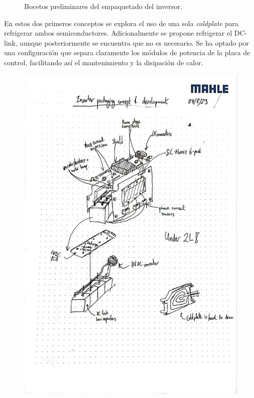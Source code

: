 \begin{figure}[H]
\begin{minipage}{0.45\textwidth}
	\end{minipage}
	\caption{Bocetos preliminares del empaquetado del inversor.}
\end{figure}

En estos dos primeros conceptos se explora el uso de una sola \textit{coldplate} para refrigerar ambos semiconductores. Adicionalmente se propone refrigerar el DC-link, aunque posteriormente se encuentra que no es necesario. Se ha optado por una configuración que separa claramente los módulos de potencia de la placa de control, facilitando así el mantenimiento y la disipación de calor.

\begin{figure}[H]
	\centering
	\begin{minipage}{0.45\textwidth}
		\centering
		\includegraphics[width=\textwidth]{fig/boceto3.png}

\end{minipage}
\end{figure}

